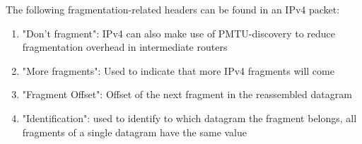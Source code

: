 The following fragmentation-related headers can be found in an IPv4 packet:
\begin{enumerate}
    \item "Don't fragment": IPv4 can also make use of PMTU-discovery to reduce fragmentation overhead in intermediate routers
    \item "More fragments": Used to indicate that more IPv4 fragments will come
    \item "Fragment Offset": Offset of the next fragment in the reassembled datagram
    \item "Identification": used to identify to which datagram the fragment belongs, all fragments of a single datagram have the same value
\end{enumerate}